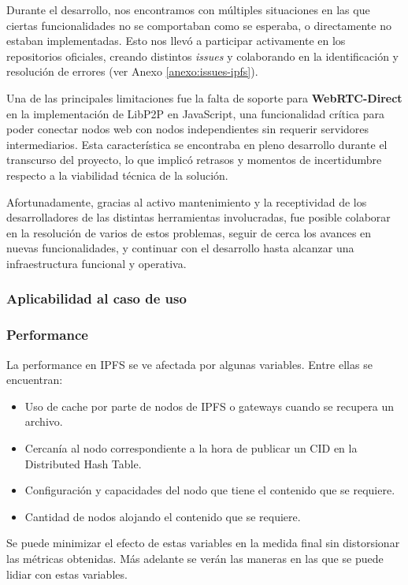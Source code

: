 Durante el desarrollo, nos encontramos con múltiples situaciones en las que ciertas funcionalidades no se comportaban como se esperaba, o directamente no estaban implementadas. Esto nos llevó a participar activamente en los repositorios oficiales, creando distintos \textit{issues} y colaborando en la identificación y resolución de errores (ver Anexo \ref{anexo:issues-ipfs}).

Una de las principales limitaciones fue la falta de soporte para \textbf{WebRTC-Direct} en la implementación de LibP2P en JavaScript, una funcionalidad crítica para poder conectar nodos web con nodos independientes sin requerir servidores intermediarios. Esta característica se encontraba en pleno desarrollo durante el transcurso del proyecto, lo que implicó retrasos y momentos de incertidumbre respecto a la viabilidad técnica de la solución.

Afortunadamente, gracias al activo mantenimiento y la receptividad de los desarrolladores de las distintas herramientas involucradas, fue posible colaborar en la resolución de varios de estos problemas, seguir de cerca los avances en nuevas funcionalidades, y continuar con el desarrollo hasta alcanzar una infraestructura funcional y operativa.

\subsubsection{Aplicabilidad al caso de uso}

\subsubsection{Performance}

La performance en IPFS se ve afectada por algunas variables. Entre ellas se encuentran:

\begin{itemize}
    \item Uso de cache por parte de nodos de IPFS o gateways cuando se recupera un archivo.
    \item Cercanía al nodo correspondiente a la hora de publicar un CID en la Distributed Hash Table.
    \item Configuración y capacidades del nodo que tiene el contenido que se requiere.
    \item Cantidad de nodos alojando el contenido que se requiere.
\end{itemize}

 Se puede minimizar  el efecto de estas variables en la medida final sin distorsionar las métricas obtenidas. Más adelante se verán las maneras en las que se puede lidiar con estas variables.

